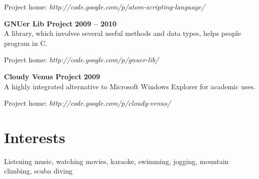 \documentclass[margin,line]{resume}
\begin{document}
\begin{resume}
    Project home: \textsl{http://code.google.com/p/atom-scripting-language/}

    \textbf{GNUer Lib Project} \hfill \textbf{2009 -- 2010}\vspace{2mm}\\\vspace{1mm}%
    A library, which involves several useful methods and data types, helps people program in C.

    Project home: \textsl{http://code.google.com/p/gnuer-lib/}

    \textbf{Cloudy Venus Project} \hfill \textbf{2009}\vspace{2mm}\\\vspace{1mm}%
    A highly integrated alternative to Microsoft Windows Explorer for academic uses.

    Project home: \textsl{http://code.google.com/p/cloudy-venus/}

    \section{\mysidestyle Interests}

    Listening music, watching movies, karaoke, swimming, jogging, mountain climbing, scuba diving

\end{resume}
\end{document}
